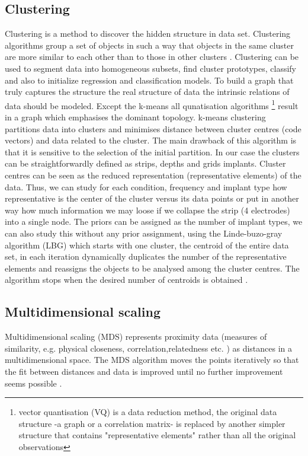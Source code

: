 \documentclass[11pt, onecolumn]{article}
\begin{document}
\subsection*{Clustering}
Clustering is a method to discover the hidden structure in  data set. 
Clustering algorithms group a set of objects in such a way that objects in the same cluster are more similar to each other than to those in other clusters \citep{vathy2013graph}. Clustering can be used to segment data into homogeneous subsets, find cluster prototypes, classify and also to initialize regression and classification models. To build a graph that truly captures the structure the real structure of data the intrinsic relations of data should be modeled. Except the k-means all qunatisation algorithms \footnote{vector quantisation (VQ)  is a data reduction method, the original data structure -a graph or a correlation matrix- is replaced by another simpler structure that contains "representative elements" rather than all the original observations} result in a graph which emphasises the dominant topology. k-means clustering partitions data into clusters and minimises distance between cluster centres (code vectors) and data related to the cluster. The main drawback of this algorithm is that it is sensitive to the selection of the initial partition. In our case the clusters can be straightforwardly   defined as strips, depths and grids implants. Cluster centres can be
seen as the reduced representation (representative elements) of the data. Thus, we can study for each condition, frequency and implant type how representative is the center of the cluster versus its data points or put in another way how much information we may loose if we collapse the strip (4 electrodes) into a single node. The priors can be assigned as the number of implant types, we can also study this without any prior assignment, using the Linde-buzo-gray algorithm (LBG) which starts with one cluster, the centroid of the entire data set, in each iteration dynamically duplicates the number of the representative elements and reassigns the objects to be analysed among the cluster centres. The algorithm stops when the desired number of centroids is obtained \citep{linde1980algorithm}.




\subsection*{Multidimensional scaling}
Multidimensional scaling (MDS) represents proximity data (measures of similarity, e.g. physical closeness, correlation,relatedness etc. ) as distances in a multidimensional space. The MDS algorithm moves the points iteratively so that the fit between distances and data is improved until no further improvement seems possible \citep{borg_modern_2005}.
\end{document}
